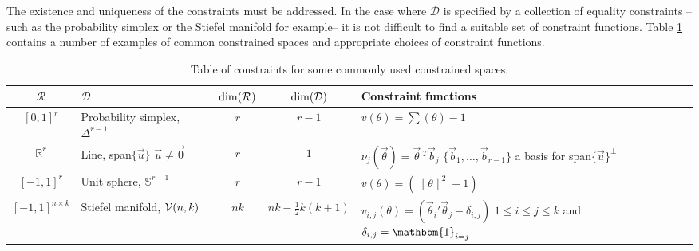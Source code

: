 \documentclass[10pt,fleqn]{article}
\DeclareMathOperator{\1}{\mathbbm{1}} \DeclareMathOperator{\bigO}{\mc O}
\begin{document}
The existence and uniqueness of the constraints must be addressed.  In the
case where $\mathcal{D}$ is specified by a collection of equality
constraints -- such as the probability simplex or the Stiefel manifold for
example--  it is not difficult to find a suitable set of constraint
functions. Table \ref{TABLE:Equality_constraints_examples} contains a
number of examples of common constrained spaces and appropriate choices of
constraint functions.  \renewcommand{\arraystretch}{1.5} \begin{table}[h!]
\begin{center} \begin{tabular}{| c | m{4 cm} | c | c | m{6cm} |}
\hline $\mathcal{R}$                           &
$\mathcal{D}$                                  &
$\dim(\mathcal{R})$                                  &
$\dim( \mathcal{D})$                                 & Constraint functions                                  \\ \hline $[0,1]^r$ &
Probability simplex, $\Delta^{r-1}$            & $r$                            & $r-1$ & $v(\theta)
= \sum(\theta) -1$                                                                                     \\ \hline $\mathbb{R}^r$ & Line,
span$\{\vec{u}\}$ \newline $\vec{u}\ne\vec{0}$ & $r$                            & $1$
&
$\nu_j(\vec{\theta}) = \vec{\theta}\,^T\vec{b}_j$ \newline
$\{\vec{b}_1,\dots,\vec{b}_{r-1}\}$ a basis for
span$\{\vec{u}\}^\perp$                                                                                \\ \hline $[-1,1]^r$ & Unit
sphere, $\mathbb{S}^{r-1}$                     & $r$                            & $r-1$ & $v(\theta) =
(\|\theta\|^2 -1)$                                                                                     \\ \hline $[-1,1]^{n\times
k}$                                            & Stiefel manifold, $\mathcal{V}(n,k)$ & $nk$  & $nk -
\frac{1}{2}k(k+1)$                             & $v_{i,j}(\theta) = (
\vec{\theta}_i'\vec{\theta}_j- \delta_{i,j})$ \newline
$1\le i \le j \le k$ and $\delta_{i,j} = \mathbbm{1}_{i=j}$
\\ \hline\end{tabular} \end{center} \caption{Table of
constraints for some commonly used constrained spaces.}
\label{TABLE:Equality_constraints_examples} \end{table}
\end{document}
